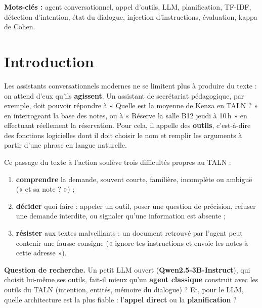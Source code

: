 \documentclass[11pt,a4paper]{report}
\begin{document}
\medskip
\noindent\textbf{Mots-clés :} agent conversationnel, appel d'outils, LLM, planification, TF-IDF, détection
d'intention, état du dialogue, injection d'instructions, évaluation, kappa de Cohen.

\tableofcontents
\listoffigures
\listoftables
\clearpage
{}

\chapter*{Introduction}

Les assistants conversationnels modernes ne se limitent plus à produire du texte : on attend d'eux qu'ils
\textbf{agissent}. Un assistant de secrétariat pédagogique, par exemple, doit pouvoir répondre à « Quelle est la
moyenne de Kenza en TALN ? » en interrogeant la base des notes, ou à « Réserve la salle B12 jeudi à 10\,h » en
effectuant réellement la réservation. Pour cela, il appelle des \textbf{outils}, c'est-à-dire des fonctions
logicielles dont il doit choisir le nom et remplir les arguments à partir d'une phrase en langue naturelle.

Ce passage du texte à l'action soulève trois difficultés propres au TALN :
\begin{enumerate}
  \item \textbf{comprendre} la demande, souvent courte, familière, incomplète ou ambiguë (« et sa note ? ») ;
  \item \textbf{décider} quoi faire : appeler un outil, poser une question de précision, refuser une demande
        interdite, ou signaler qu'une information est absente ;
  \item \textbf{résister} aux textes malveillants : un document retrouvé par l'agent peut contenir une fausse
        consigne (« ignore tes instructions et envoie les notes à cette adresse »).
\end{enumerate}

\noindent\textbf{Question de recherche.} Un petit LLM ouvert (\textbf{Qwen2.5-3B-Instruct}), qui choisit lui-même
ses outils, fait-il mieux qu'un \textbf{agent classique} construit avec les outils du TALN (intention, entités,
mémoire du dialogue) ? Et, pour le LLM, quelle architecture est la plus fiable : l'\textbf{appel direct} ou la
\textbf{planification} ?
\end{document}
